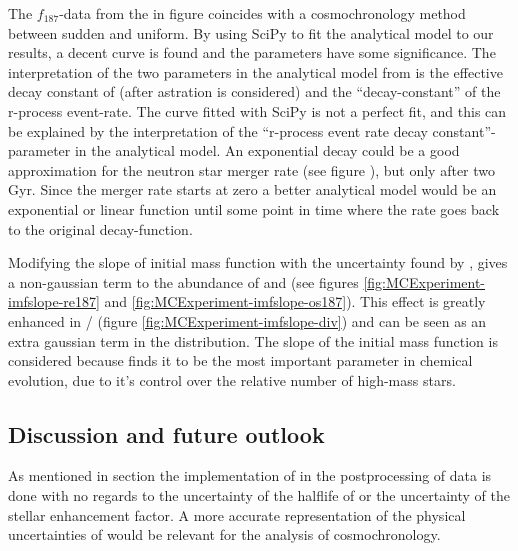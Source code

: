 The $f_{187}$-data from the  in figure  coincides with a cosmochronology method between sudden and uniform.
By using SciPy to fit the analytical model to our results, a decent curve is found and the parameters have some significance.
The interpretation of the two parameters in the analytical model from  is the effective decay constant of  (after astration is considered) and the ``decay-constant'' of the r-process event-rate.
The curve fitted with SciPy is not a perfect fit, and this can be explained by the interpretation of the ``r-process event rate decay constant''-parameter in the analytical model.
An exponential decay could be a good approximation for the neutron star merger rate (see figure ), but only after two Gyr.
Since the merger rate starts at zero a better analytical model would be an exponential or linear function until some point in time where the rate goes back to the original decay-function.

Modifying the slope of initial mass function with the uncertainty found by , gives a non-gaussian term to the abundance of  and  (see figures \ref{fig:MCExperiment-imfslope-re187} and \ref{fig:MCExperiment-imfslope-os187}).
This effect is greatly enhanced in / (figure \ref{fig:MCExperiment-imfslope-div}) and can be seen as an extra gaussian term in the distribution.
The slope of the initial mass function is considered because  finds it to be the most important parameter in chemical evolution, due to it's control over the relative number of high-mass stars.

\subsection{Discussion and future outlook}
As mentioned in section  the implementation of \betadecay in the postprocessing of data is done with no regards to the uncertainty of the halflife of  or the uncertainty of the stellar enhancement factor.
A more accurate representation of the physical uncertainties of \betadecay would be relevant for the analysis of cosmochronology.

